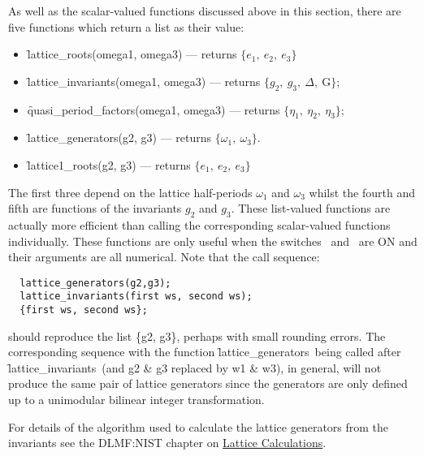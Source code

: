 As well as the scalar-valued functions discussed above in this section,
there are five functions which return a list as their value:
\hypertarget{operator:LATTICE_ROOTS}{}
\hypertarget{operator:LATTICE_INVARIANTS}{}
\hypertarget{operator:LATTICE_GENERATORS}{}
\hypertarget{operator:QUASI_PERIOD_FACTORS}{}
\begin{itemize}
\item \f{lattice\_roots(omega1, omega3)} --- returns $\{e_1,\ e_2,\ e_3\}$
\item \f{lattice\_invariants(omega1, omega3)} --- returns
  $\{g_2,\ g_3,\ \Delta,\ \mathrm{G}\}$;
\item \f{quasi\_period\_factors(omega1, omega3)}
  --- returns $\{\eta_1,\ \eta_2,\ \eta_3\}$;
\item \f{lattice\_generators(g2, g3)}  --- returns $\{\omega_1,\ \omega_3\}$.
\item \f{lattice1\_roots(g2, g3)}  --- returns $\{e_1,\ e_2,\ e_3\}$
\end{itemize}
The first three depend on the lattice half-periods $\omega_1$ and $\omega_3$ whilst
the fourth and fifth are functions of the invariants $g_2$ and $g_3$. These
list-valued functions are actually more efficient than calling the corresponding
scalar-valued functions individually.
These functions are only useful when the switches \ and
\ are ON and their arguments are all numerical.
Note that the call sequence:
\begin{verbatim}
  lattice_generators(g2,g3);
  lattice_invariants(first ws, second ws);
  {first ws, second ws};
\end{verbatim}
should reproduce the list \{g2, g3\}, perhaps with small rounding errors. The
corresponding sequence with the function \f{lattice\_generators}\ being called
after \f{lattice\_invariants}\ (and g2 \& g3 replaced by w1 \& w3),
in general, will not produce the same pair of lattice generators since the
generators are only defined up to a unimodular bilinear integer transformation.

For details of the algorithm used to calculate the lattice generators from the
invariants see the DLMF:NIST chapter on
\href{https://dlmf.nist.gov/23.22#ii}{Lattice Calculations}.

